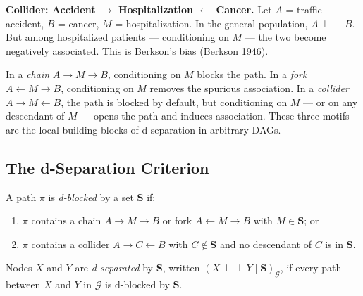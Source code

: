 \documentclass[
  a4paper,
]{book}
\providecommand{\tightlist}{%
  \setlength{\itemsep}{0pt}\setlength{\parskip}{0pt}}
\newcommand{\indep}{\perp\!\!\!\perp}
\newcommand{\Gcal}{\mathcal{G}}
\begin{document}
\textbf{Collider: Accident \(\to\) Hospitalization \(\leftarrow\)
Cancer.} Let \(A\) = traffic accident, \(B\) = cancer, \(M\) =
hospitalization. In the general population, \(A \indep B\). But among
hospitalized patients --- conditioning on \(M\) --- the two become
negatively associated. This is Berkson's bias (Berkson 1946).

\begin{tcolorbox}[enhanced jigsaw, arc=.35mm, bottomrule=.15mm, bottomtitle=1mm, breakable, colback=white, colbacktitle=quarto-callout-note-color!10!white, colframe=quarto-callout-note-color-frame, coltitle=black, left=2mm, leftrule=.75mm, opacityback=0, opacitybacktitle=0.6, rightrule=.15mm, title={Three-Node Motifs at a Glance}, titlerule=0mm, toprule=.15mm, toptitle=1mm]

In a \emph{chain} \(A \to M \to B\), conditioning on \(M\) blocks the
path. In a \emph{fork} \(A \leftarrow M \to B\), conditioning on \(M\)
removes the spurious association. In a \emph{collider}
\(A \to M \leftarrow B\), the path is blocked by default, but
conditioning on \(M\) --- or on any descendant of \(M\) --- opens the
path and induces association. These three motifs are the local building
blocks of d-separation in arbitrary DAGs.

\end{tcolorbox}

\subsection{The d-Separation
Criterion}\label{the-d-separation-criterion}

\begin{tcolorbox}[enhanced jigsaw, arc=.35mm, bottomrule=.15mm, bottomtitle=1mm, breakable, colback=white, colbacktitle=quarto-callout-note-color!10!white, colframe=quarto-callout-note-color-frame, coltitle=black, left=2mm, leftrule=.75mm, opacityback=0, opacitybacktitle=0.6, rightrule=.15mm, title={Definition: d-Blocking and d-Separation}, titlerule=0mm, toprule=.15mm, toptitle=1mm]

A path \(\pi\) is \emph{d-blocked} by a set \(\mathbf{S}\) if:

\begin{enumerate}
\def\labelenumi{\arabic{enumi}.}
\tightlist
\item
  \(\pi\) contains a chain \(A \to M \to B\) or fork
  \(A \leftarrow M \to B\) with \(M \in \mathbf{S}\); or
\item
  \(\pi\) contains a collider \(A \to C \leftarrow B\) with
  \(C \notin \mathbf{S}\) and no descendant of \(C\) is in
  \(\mathbf{S}\).
\end{enumerate}

Nodes \(X\) and \(Y\) are \emph{d-separated} by \(\mathbf{S}\), written
\((X \indep Y \mid \mathbf{S})_{\Gcal}\), if every path between \(X\)
and \(Y\) in \(\Gcal\) is d-blocked by \(\mathbf{S}\).

\end{tcolorbox}
\end{document}
